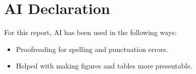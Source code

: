 \chapter{AI Declaration}

For this report, AI has been used in the following ways:
\begin{itemize}
    \item Proofreading for spelling and punctuation errors.
    \item Helped with making figures and tables more presentable.
\end{itemize}
